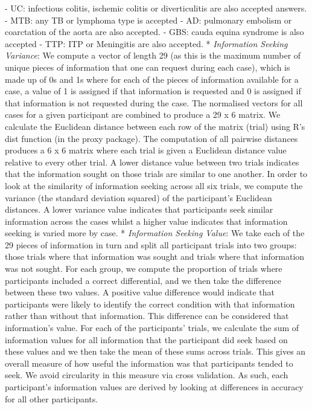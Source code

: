 \documentclass[a4paper, nobind]{templates/ociamthesis}
\begin{document}
- UC: infectious colitis, ischemic colitis or diverticulitis are also accepted answers.
- MTB: any TB or lymphoma type is accepted
- AD: pulmonary embolism or coarctation of the aorta are also accepted.
- GBS: cauda equina syndrome is also accepted
- TTP: ITP or Meningitis are also accepted.
* \emph{Information Seeking Variance}: We compute a vector of length 29 (as this is the maximum number of unique pieces of information that one can request during each case), which is made up of 0s and 1s where for each of the pieces of information available for a case, a value of 1 is assigned if that information is requested and 0 is assigned if that information is not requested during the case. The normalised vectors for all cases for a given participant are combined to produce a 29 x 6 matrix. We calculate the Euclidean distance between each row of the matrix (trial) using R's dist function (in the proxy package). The computation of all pairwise distances produces a 6 x 6 matrix where each trial is given a Euclidean distance value relative to every other trial. A lower distance value between two trials indicates that the information sought on those trials are similar to one another. In order to look at the similarity of information seeking across all six trials, we compute the variance (the standard deviation squared) of the participant's Euclidean distances. A lower variance value indicates that participants seek similar information across the cases whilst a higher value indicates that information seeking is varied more by case.
* \emph{Information Seeking Value}: We take each of the 29 pieces of information in turn and split all participant trials into two groups: those trials where that information was sought and trials where that information was not sought. For each group, we compute the proportion of trials where participants included a correct differential, and we then take the difference between these two values. A positive value difference would indicate that participants were likely to identify the correct condition with that information rather than without that information. This difference can be considered that information's value. For each of the participants' trials, we calculate the sum of information values for all information that the participant did seek based on these values and we then take the mean of these sums across trials. This gives an overall measure of how useful the information was that participants tended to seek. We avoid circularity in this measure via cross validation. As such, each participant's information values are derived by looking at differences in accuracy for all other participants.
\end{document}

